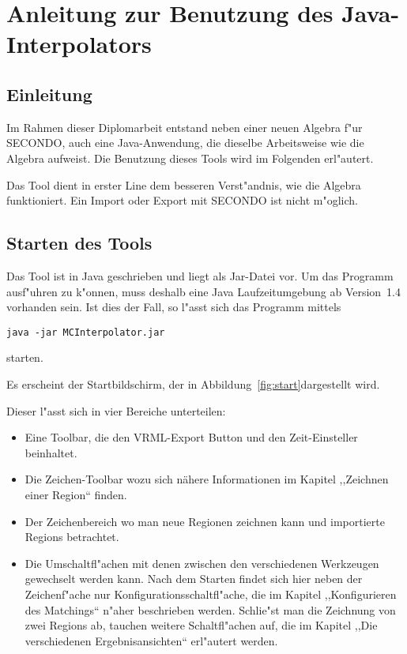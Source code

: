 
\chapter{Anleitung zur Benutzung des Java-Interpolators}\label{Handbuch}
\minitoc
\newpage
\section{Einleitung}
Im Rahmen dieser Diplomarbeit entstand neben einer neuen Algebra f"ur SECONDO, auch eine Java-Anwendung, die dieselbe Arbeitsweise wie die Algebra aufweist. Die Benutzung dieses Tools wird im Folgenden erl"autert.

Das Tool dient in erster Line dem besseren Verst"andnis, wie die Algebra funktioniert. Ein Import oder Export mit SECONDO ist nicht m"oglich.

\section{Starten des Tools}
Das Tool ist in Java geschrieben und liegt als Jar-Datei vor. Um das Programm ausf"uhren zu k"onnen, muss deshalb eine Java Laufzeitumgebung ab Version~1.4 vorhanden sein. Ist dies der Fall, so l"asst sich das Programm mittels \begin{verbatim}
java -jar MCInterpolator.jar
\end{verbatim}  starten.

Es erscheint der Startbildschirm, der in Abbildung~\vref{fig:start}dargestellt wird.

Dieser l"asst sich in vier Bereiche unterteilen:
\begin{itemize}
\item Eine Toolbar, die den VRML-Export Button und den Zeit-Einsteller beinhaltet. 
\item Die Zeichen-Toolbar wozu sich nähere Informationen im Kapitel ,,Zeichnen einer Region`` finden.
\item Der Zeichenbereich wo man neue Regionen zeichnen kann und importierte Regions betrachtet.
\item Die Umschaltfl"achen  mit denen zwischen den verschiedenen Werkzeugen gewechselt werden kann. Nach dem Starten findet sich hier neben der Zeichenf"ache nur Konfigurationsschaltfl"ache, die im Kapitel ,,Konfigurieren des Matchings`` n"aher beschrieben werden. Schlie"st man die Zeichnung von zwei Regions ab, tauchen weitere Schaltfl"achen auf, die im Kapitel ,,Die verschiedenen Ergebnisansichten`` erl"autert werden.
\end{itemize} 

